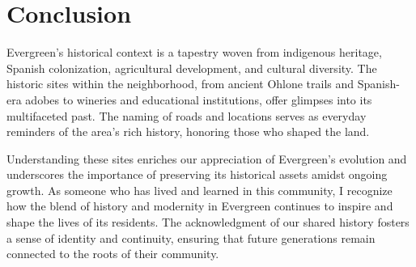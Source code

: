\documentclass[12pt]{article}
\begin{document}
\section*{Conclusion}

Evergreen's historical context is a tapestry woven from indigenous heritage, Spanish colonization, agricultural development, and cultural diversity. The historic sites within the neighborhood, from ancient Ohlone trails and Spanish-era adobes to wineries and educational institutions, offer glimpses into its multifaceted past. The naming of roads and locations serves as everyday reminders of the area's rich history, honoring those who shaped the land.

Understanding these sites enriches our appreciation of Evergreen's evolution and underscores the importance of preserving its historical assets amidst ongoing growth. As someone who has lived and learned in this community, I recognize how the blend of history and modernity in Evergreen continues to inspire and shape the lives of its residents. The acknowledgment of our shared history fosters a sense of identity and continuity, ensuring that future generations remain connected to the roots of their community.



\end{document}
